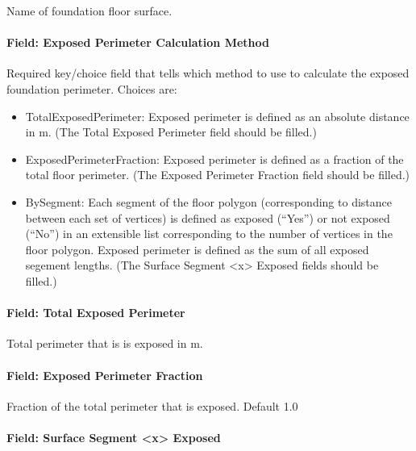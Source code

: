 Name of foundation floor surface.

\paragraph{Field: Exposed Perimeter Calculation Method}\label{field-exposed-perimeter-calculation-method}

Required key/choice field that tells which method to use to calculate the exposed foundation perimeter. Choices are:

\begin{itemize}
\item TotalExposedPerimeter: Exposed perimeter is defined as an absolute distance in m. (The Total Exposed Perimeter field should be filled.)

\item ExposedPerimeterFraction: Exposed perimeter is defined as a fraction of the total floor perimeter. (The Exposed Perimeter Fraction field should be filled.)

\item BySegment: Each segment of the floor polygon (corresponding to distance between each set of vertices) is defined as exposed (``Yes'') or not exposed (``No'') in an extensible list corresponding to the number of vertices in the floor polygon. Exposed perimeter is defined as the sum of all exposed segement lengths. (The Surface Segment \textless{}x\textgreater{}
Exposed fields should be filled.)
\end{itemize}

\paragraph{Field: Total Exposed Perimeter}\label{surfaceproperty-exposedfoundationperimeter-total-exposed-perimeter}

Total perimeter that is is exposed in m.

\paragraph{Field: Exposed Perimeter Fraction}\label{surfaceproperty-exposedfoundationperimeter-exposed-perimeter-fraction}

Fraction of the total perimeter that is exposed. Default 1.0

\paragraph{Field: Surface Segment \textless{}x\textgreater{} Exposed}\label{surfaceproperty-exposedfoundationperimeter-surface-segment-x-exposed}

